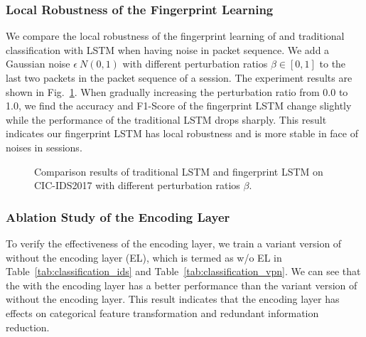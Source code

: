 \subsubsection{Local Robustness of the Fingerprint Learning}
We compare the local robustness of the fingerprint learning of \sys and traditional classification with LSTM when having noise in packet sequence.
We add a Gaussian noise $\epsilon~N(0, 1)$ with different perturbation ratios $\beta \in [0, 1]$ to the last two packets in the packet sequence of a session.
The experiment results are shown in Fig.~\ref{fig:perturbation}.
When gradually increasing the perturbation ratio from 0.0 to 1.0, we find the accuracy and F1-Score of the fingerprint LSTM change slightly while the performance of the traditional LSTM drops sharply. 
This result indicates our fingerprint LSTM has local robustness and is more stable in face of noises in sessions.
\begin{figure}[htbp]
	\centering
	\hfill
	\caption{Comparison results of traditional LSTM and fingerprint LSTM on CIC-IDS2017 with different perturbation ratios $\beta$.}
	\label{fig:perturbation}
\end{figure}

\subsubsection{Ablation Study of the Encoding Layer}
To verify the effectiveness of the encoding layer, we train a variant version of \sys without the encoding layer (EL), which is termed as \sys w/o EL in Table~\ref{tab:classification_ids} and Table~\ref{tab:classification_vpn}.
We can see that the \sys with the encoding layer has a better performance than the variant version of \sys without the encoding layer. 
This result indicates that the encoding layer has effects on categorical feature transformation and redundant information reduction. 

